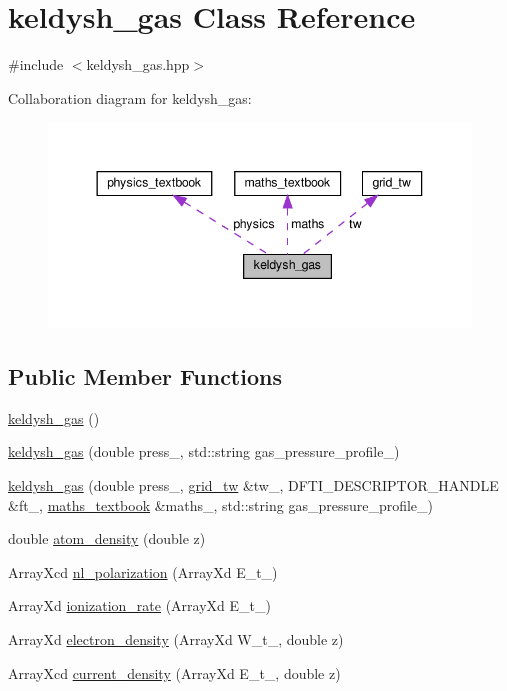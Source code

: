 \hypertarget{classkeldysh__gas}{}\section{keldysh\+\_\+gas Class Reference}
\label{classkeldysh__gas}


{\ttfamily \#include $<$keldysh\+\_\+gas.\+hpp$>$}



Collaboration diagram for keldysh\+\_\+gas\+:\nopagebreak
\begin{figure}[H]
\begin{center}
\leavevmode
\includegraphics[width=344pt]{classkeldysh__gas__coll__graph}
\end{center}
\end{figure}
\subsection*{Public Member Functions}
\begin{DoxyCompactItemize}
\item 
\hyperlink{classkeldysh__gas_a25e559700c04e93efb560db511adbe72}{keldysh\+\_\+gas} ()
\item 
\hyperlink{classkeldysh__gas_a7889120c043b13492fa58878c5459099}{keldysh\+\_\+gas} (double press\+\_\+, std\+::string gas\+\_\+pressure\+\_\+profile\+\_\+)
\item 
\hyperlink{classkeldysh__gas_ae5510e8e448e96280f71b410907debf6}{keldysh\+\_\+gas} (double press\+\_\+, \hyperlink{classgrid__tw}{grid\+\_\+tw} \&tw\+\_\+, D\+F\+T\+I\+\_\+\+D\+E\+S\+C\+R\+I\+P\+T\+O\+R\+\_\+\+H\+A\+N\+D\+LE \&ft\+\_\+, \hyperlink{classmaths__textbook}{maths\+\_\+textbook} \&maths\+\_\+, std\+::string gas\+\_\+pressure\+\_\+profile\+\_\+)
\item 
double \hyperlink{classkeldysh__gas_acfa0604a6f00bce28b72b9a07fb79314}{atom\+\_\+density} (double z)
\item 
Array\+Xcd \hyperlink{classkeldysh__gas_a1cd65d1983cb6c5ff9d04eeb29e94dd5}{nl\+\_\+polarization} (Array\+Xd E\+\_\+t\+\_\+)
\item 
Array\+Xd \hyperlink{classkeldysh__gas_a42dc79816adcae9c25499baa7256ec10}{ionization\+\_\+rate} (Array\+Xd E\+\_\+t\+\_\+)
\item 
Array\+Xd \hyperlink{classkeldysh__gas_a8dddacdfabea4d6c3049088cc868715a}{electron\+\_\+density} (Array\+Xd W\+\_\+t\+\_\+, double z)
\item 
Array\+Xcd \hyperlink{classkeldysh__gas_a7d5f16951d622544d814518a37768411}{current\+\_\+density} (Array\+Xd E\+\_\+t\+\_\+, double z)
\end{DoxyCompactItemize}
